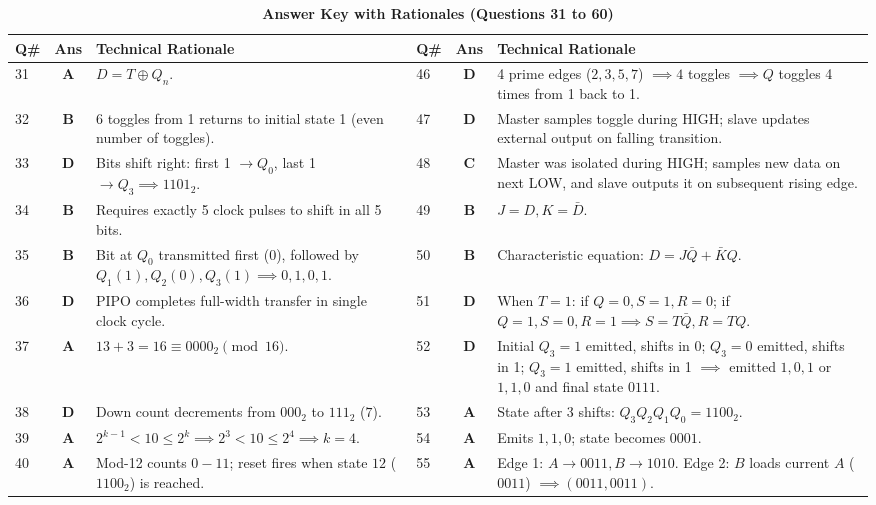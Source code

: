 \begin{table}[htbp]
\centering
\caption{\textbf{Answer Key with Rationales (Questions 31 to 60)}}
\vspace{2mm}
\small
\begin{tabularx}{\textwidth}{l c X l c X}
\toprule
\textbf{Q\#} & \textbf{Ans} & \textbf{Technical Rationale} & \textbf{Q\#} & \textbf{Ans} & \textbf{Technical Rationale} \\
\midrule
31 & \textbf{A} & $D = T \oplus Q_n$. & 46 & \textbf{D} & 4 prime edges ($2, 3, 5, 7$) $\implies 4$ toggles $\implies Q$ toggles 4 times from 1 back to 1. \\
32 & \textbf{B} & 6 toggles from 1 returns to initial state 1 (even number of toggles). & 47 & \textbf{D} & Master samples toggle during HIGH; slave updates external output on falling transition. \\
33 & \textbf{D} & Bits shift right: first 1 $\to Q_0$, last 1 $\to Q_3 \implies 1101_2$. & 48 & \textbf{C} & Master was isolated during HIGH; samples new data on next LOW, and slave outputs it on subsequent rising edge. \\
34 & \textbf{B} & Requires exactly 5 clock pulses to shift in all 5 bits. & 49 & \textbf{B} & $J = D, K = \bar{D}$. \\
35 & \textbf{B} & Bit at $Q_0$ transmitted first ($0$), followed by $Q_1(1), Q_2(0), Q_3(1) \implies 0, 1, 0, 1$. & 50 & \textbf{B} & Characteristic equation: $D = J\bar{Q} + \bar{K}Q$. \\
36 & \textbf{D} & PIPO completes full-width transfer in single clock cycle. & 51 & \textbf{D} & When $T=1$: if $Q=0, S=1, R=0$; if $Q=1, S=0, R=1 \implies S=T\bar{Q}, R=TQ$. \\
37 & \textbf{A} & $13 + 3 = 16 \equiv 0000_2 \pmod{16}$. & 52 & \textbf{D} & Initial $Q_3=1$ emitted, shifts in 0; $Q_3=0$ emitted, shifts in 1; $Q_3=1$ emitted, shifts in 1 $\implies$ emitted $1,0,1$ or $1,1,0$ and final state $0111$. \\
38 & \textbf{D} & Down count decrements from $000_2$ to $111_2$ ($7$). & 53 & \textbf{A} & State after 3 shifts: $Q_3Q_2Q_1Q_0 = 1100_2$. \\
39 & \textbf{A} & $2^{k-1} < 10 \le 2^k \implies 2^3 < 10 \le 2^4 \implies k = 4$. & 54 & \textbf{A} & Emits $1, 1, 0$; state becomes $0001$. \\
40 & \textbf{A} & Mod-12 counts $0-11$; reset fires when state $12$ ($1100_2$) is reached. & 55 & \textbf{A} & Edge 1: $A \to 0011, B \to 1010$. Edge 2: $B$ loads current $A$ ($0011$) $\implies (0011, 0011)$. \\

\end{tabularx}
\end{table}

